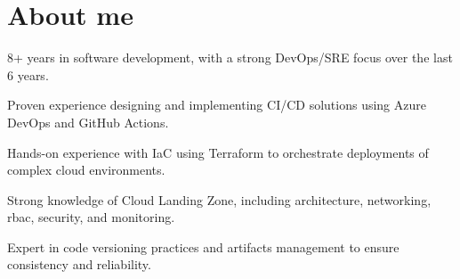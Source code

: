 \documentclass[11pt]{deedy-resume-openfont}
\begin{document}
    
%
%
\sectionsep
\sectionsep
{}
%
%
\vspace{1cm}
\section{About me}
\vspace{2pt}
\begin{tightemize}
	\item 8+ years in software development, with a strong DevOps/SRE focus over the last 6 years.
	\item Proven experience designing and implementing CI/CD solutions using Azure DevOps and GitHub Actions.
	\item Hands-on experience with IaC using Terraform to orchestrate deployments of complex cloud environments.
	\item Strong knowledge of Cloud Landing Zone, including architecture, networking, rbac, security, and monitoring.
	\item Expert in code versioning practices and artifacts management to ensure consistency and reliability.
\end{tightemize}
%
%
\vspace{1cm}
\end{document}
